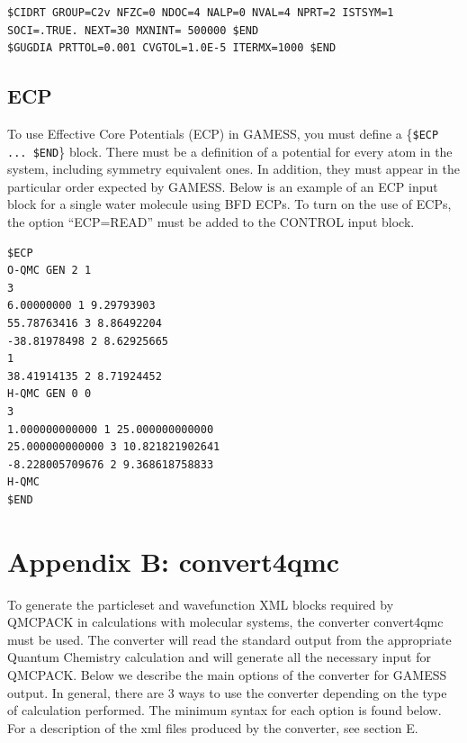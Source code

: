 \begin{lstlisting}
$CIDRT GROUP=C2v NFZC=0 NDOC=4 NALP=0 NVAL=4 NPRT=2 ISTSYM=1 SOCI=.TRUE. NEXT=30 MXNINT= 500000 $END
$GUGDIA PRTTOL=0.001 CVGTOL=1.0E-5 ITERMX=1000 $END
\end{lstlisting}


\subsection{ECP}
To use Effective Core Potentials (ECP) in GAMESS, you must define a \{\texttt{\$ECP ... \$END}\} 
block. There must be a definition of a potential for every atom in the system, including
symmetry equivalent ones. In addition, they must appear in the particular order expected
by GAMESS. Below is an example of an ECP input block for a single water molecule using
BFD ECPs. To turn on the use of ECPs, the option “ECP=READ” must be added to the
CONTROL input block.

\begin{lstlisting}
$ECP
O-QMC GEN 2 1
3
6.00000000 1 9.29793903
55.78763416 3 8.86492204
-38.81978498 2 8.62925665
1
38.41914135 2 8.71924452
H-QMC GEN 0 0
3
1.000000000000 1 25.000000000000
25.000000000000 3 10.821821902641
-8.228005709676 2 9.368618758833
H-QMC
$END
\end{lstlisting}


\newpage
\section{Appendix B: convert4qmc}
To generate the particleset and wavefunction XML blocks required by QMCPACK in
calculations with molecular systems, the converter convert4qmc must be used. The converter
will read the standard output from the appropriate Quantum Chemistry calculation and will
generate all the necessary input for QMCPACK. Below we describe the main options of the
converter for GAMESS output. In general, there are 3 ways to use the converter depending
on the type of calculation performed. The minimum syntax for each option is found below.
For a description of the xml files produced by the converter, see section E.

